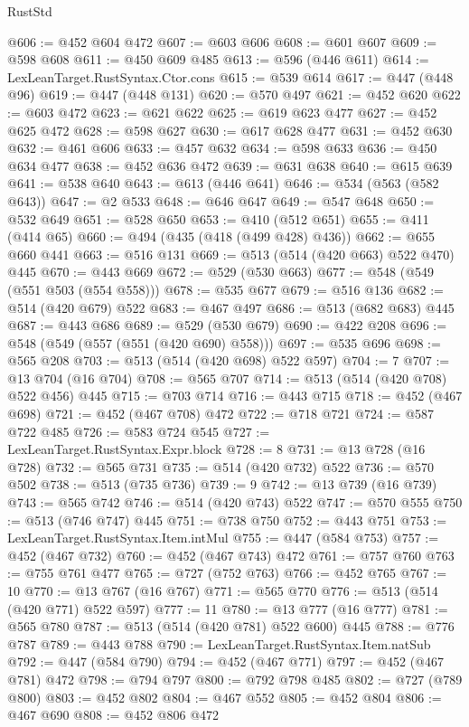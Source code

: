 \begin{lexlean}{RustStd}
\begin{coremodule}
{\begin{coremodule}
{{{{{{{{{{{@606 := @452 @604 @472
@607 := @603 @606
@608 := @601 @607
@609 := @598 @608
@611 := @450 @609 @485
@613 := @596 (@446 @611)
@614 := LexLeanTarget.RustSyntax.Ctor.cons
@615 := @539 @614
@617 := @447 (@448 @96)
@619 := @447 (@448 @131)
@620 := @570 @497
@621 := @452 @620
@622 := @603 @472
@623 := @621 @622
@625 := @619 @623 @477
@627 := @452 @625 @472
@628 := @598 @627
@630 := @617 @628 @477
@631 := @452 @630
@632 := @461 @606
@633 := @457 @632
@634 := @598 @633
@636 := @450 @634 @477
@638 := @452 @636 @472
@639 := @631 @638
@640 := @615 @639
@641 := @538 @640
@643 := @613 (@446 @641)
@646 := @534 (@563 (@582 @643))
@647 := @2 @533
@648 := @646 @647
@649 := @547 @648
@650 := @532 @649
@651 := @528 @650
@653 := @410 (@512 @651)
@655 := @411 (@414 @65)
@660 := @494 (@435 (@418 (@499 @428) @436))
@662 := @655 @660 @441
@663 := @516 @131
@669 := @513 (@514 (@420 @663) @522 @470) @445
@670 := @443 @669
@672 := @529 (@530 @663)
@677 := @548 (@549 (@551 @503 (@554 @558)))
@678 := @535 @677
@679 := @516 @136
@682 := @514 (@420 @679) @522
@683 := @467 @497
@686 := @513 (@682 @683) @445
@687 := @443 @686
@689 := @529 (@530 @679)
@690 := @422 @208
@696 := @548 (@549 (@557 (@551 (@420 @690) @558)))
@697 := @535 @696
@698 := @565 @208
@703 := @513 (@514 (@420 @698) @522 @597)
@704 := 7
@707 := @13 @704 (@16 @704)
@708 := @565 @707
@714 := @513 (@514 (@420 @708) @522 @456) @445
@715 := @703 @714
@716 := @443 @715
@718 := @452 (@467 @698)
@721 := @452 (@467 @708) @472
@722 := @718 @721
@724 := @587 @722 @485
@726 := @583 @724 @545
@727 := LexLeanTarget.RustSyntax.Expr.block
@728 := 8
@731 := @13 @728 (@16 @728)
@732 := @565 @731
@735 := @514 (@420 @732) @522
@736 := @570 @502
@738 := @513 (@735 @736)
@739 := 9
@742 := @13 @739 (@16 @739)
@743 := @565 @742
@746 := @514 (@420 @743) @522
@747 := @570 @555
@750 := @513 (@746 @747) @445
@751 := @738 @750
@752 := @443 @751
@753 := LexLeanTarget.RustSyntax.Item.intMul
@755 := @447 (@584 @753)
@757 := @452 (@467 @732)
@760 := @452 (@467 @743) @472
@761 := @757 @760
@763 := @755 @761 @477
@765 := @727 (@752 @763)
@766 := @452 @765
@767 := 10
@770 := @13 @767 (@16 @767)
@771 := @565 @770
@776 := @513 (@514 (@420 @771) @522 @597)
@777 := 11
@780 := @13 @777 (@16 @777)
@781 := @565 @780
@787 := @513 (@514 (@420 @781) @522 @600) @445
@788 := @776 @787
@789 := @443 @788
@790 := LexLeanTarget.RustSyntax.Item.natSub
@792 := @447 (@584 @790)
@794 := @452 (@467 @771)
@797 := @452 (@467 @781) @472
@798 := @794 @797
@800 := @792 @798 @485
@802 := @727 (@789 @800)
@803 := @452 @802
@804 := @467 @552
@805 := @452 @804
@806 := @467 @690
@808 := @452 @806 @472
}}}}}}}}}}}
\end{coremodule}}
\end{coremodule}
\end{lexlean}
